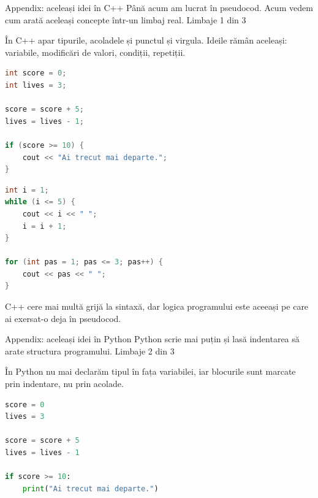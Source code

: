 \PageHeader
  {Appendix: aceleași idei în C++}
  {Până acum am lucrat în pseudocod. Acum vedem cum arată aceleași concepte într-un limbaj real.}
  {Limbaje 1 din 3}

\begin{languagebox}[Ce să observi]
În C++ apar tipurile, acoladele și punctul și virgula. Ideile rămân aceleași: variabile, modificări de valori, condiții, repetiții.
\end{languagebox}

\begin{examplebox}
\begin{lstlisting}[style=languagequest,language=C++]
int score = 0;
int lives = 3;

score = score + 5;
lives = lives - 1;

if (score >= 10) {
    cout << "Ai trecut mai departe.";
}
\end{lstlisting}
\end{examplebox}

\begin{examplebox}
\begin{lstlisting}[style=languagequest,language=C++]
int i = 1;
while (i <= 5) {
    cout << i << " ";
    i = i + 1;
}

for (int pas = 1; pas <= 3; pas++) {
    cout << pas << " ";
}
\end{lstlisting}
\end{examplebox}

\begin{languagebox}[Ne amintim]
C++ cere mai multă grijă la sintaxă, dar logica programului este aceeași pe care ai exersat-o deja în pseudocod.
\end{languagebox}

\clearpage

\PageHeader
  {Appendix: aceleași idei în Python}
  {Python scrie mai puțin și lasă indentarea să arate structura programului.}
  {Limbaje 2 din 3}

\begin{languagebox}[Ce să observi]
În Python nu mai declarăm tipul în fața variabilei, iar blocurile sunt marcate prin indentare, nu prin acolade.
\end{languagebox}

\begin{examplebox}
\begin{lstlisting}[style=languagequest,language=Python]
score = 0
lives = 3

score = score + 5
lives = lives - 1

if score >= 10:
    print("Ai trecut mai departe.")
\end{lstlisting}
\end{examplebox}

